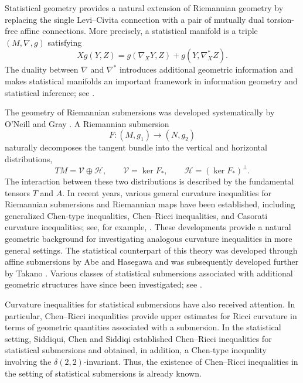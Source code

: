 \documentclass[10pt,a4paper]{article}
\theoremstyle{definition}
\theoremstyle{remark}
\numberwithin{equation}{section}
\begin{document}
Statistical geometry provides a natural extension of Riemannian geometry
by replacing the single Levi--Civita connection with a pair of mutually
dual torsion-free affine connections. More precisely, a statistical
manifold is a triple $(M,\nabla,g)$ satisfying
\[
Xg(Y,Z)
=
g(\nabla_XY,Z)+g(Y,\nabla_X^{*}Z).
\]
The duality between $\nabla$ and $\nabla^{*}$ introduces additional
geometric information and makes statistical manifolds an important
framework in information geometry and statistical inference; see
\cite{Noguchi1992,AmariNagaoka2000}.

The geometry of Riemannian submersions was developed systematically by
O'Neill \cite{ONeill1966} and Gray \cite{Gray1967}. A Riemannian
submersion
\[
F:(M,g_{1})\longrightarrow(N,g_{2})
\]
naturally decomposes the tangent bundle into the vertical and horizontal
distributions,
\[
TM=\mathcal V\oplus\mathcal H,
\qquad
\mathcal V=\ker F_{*},
\qquad
\mathcal H=(\ker F_{*})^{\perp}.
\]
The interaction between these two distributions is described by the
fundamental tensors $T$ and $A$. In recent years, various general
curvature inequalities for Riemannian submersions and Riemannian maps
have been established, including generalized Chen-type inequalities,
Chen--Ricci inequalities, and Casorati curvature inequalities; see,
for example,
\cite{Singh_26_GCI,Singh_26_RCB,Singh_26_CSM,Singh_26_GCF,Singh_26_GCR,Singh_Meena_Meena_26_JMAA,Singh_26_GCFRM}.
These developments provide a natural geometric background for
investigating analogous curvature inequalities in more general
settings. The statistical counterpart of this
theory was developed through affine submersions by Abe and Hasegawa
\cite{AbeHasegawa2001} and was subsequently developed further by Takano
\cite{Takano2004}. Various classes of statistical submersions associated
with additional geometric structures have since been investigated; see
\cite{AytimurOzgur2019,VilcuVilcu2015,Vilcu2021,
SiddiquiAlghamdi2025}.

Curvature inequalities for statistical submersions have also received
attention. In particular, Chen--Ricci inequalities provide upper
estimates for Ricci curvature in terms of geometric quantities associated
with a submersion. In the statistical setting, Siddiqui, Chen and
Siddiqi \cite{SiddiquiChenSiddiqi2021} established Chen--Ricci
inequalities for statistical submersions and obtained, in addition, a
Chen-type inequality involving the $\delta(2,2)$-invariant. Thus, the
existence of Chen--Ricci inequalities in the setting of statistical
submersions is already known.
\end{document}

